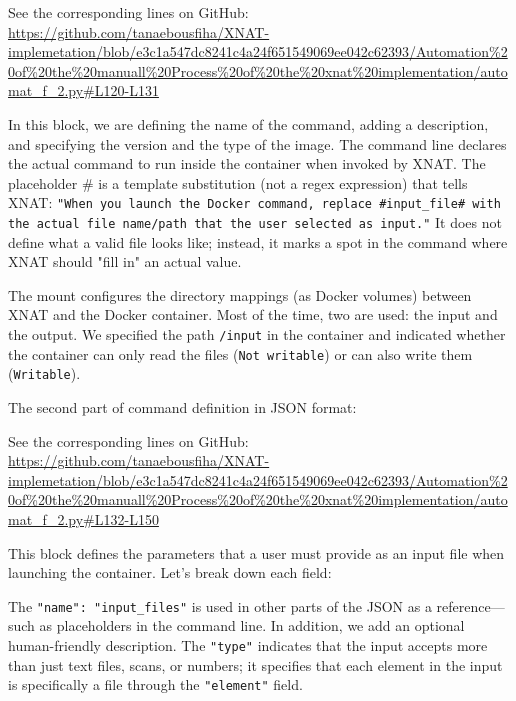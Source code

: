 \noindent\footnotesize See the corresponding lines on GitHub:\url{ https://github.com/tanaebousfiha/XNAT-implemetation/blob/e3c1a547dc8241c4a24f651549069ee042c62393/Automation%20of%20the%20manuall%20Process%20of%20the%20xnat%20implementation/automat_f_2.py#L120-L131}
\normalsize


In this block, we are defining the name of the command, adding a description, and specifying the version and the type of the image.
The command line declares the actual command to run inside the container when invoked by XNAT. The placeholder \# is a template substitution (not a regex expression) that tells XNAT: \texttt{"When you launch the Docker command, replace \#input\_file\# with the actual file name/path that the user selected as input."} It does not define what a valid file looks like; instead, it marks a spot in the command where XNAT should "fill in" an actual value.


The mount configures the directory mappings (as Docker volumes) between XNAT and the Docker container. Most of the time, two are used: the input and the output.
We specified the path \texttt{/input} in the container and indicated whether the container can only read the files (\texttt{Not writable}) or can also write them (\texttt{Writable}).

The second part of command definition in JSON format:




\noindent\footnotesize See the corresponding lines on GitHub: \url{ https://github.com/tanaebousfiha/XNAT-implemetation/blob/e3c1a547dc8241c4a24f651549069ee042c62393/Automation%20of%20the%20manuall%20Process%20of%20the%20xnat%20implementation/automat_f_2.py#L132-L150}
\normalsize

This block defines the parameters that a user must provide as an input file when launching the container.
Let’s break down each field:

The \texttt{"name": "input\_files"} is used in other parts of the JSON as a reference---such as placeholders in the command line. In addition, we add an optional human-friendly description. The \texttt{"type"} indicates that the input accepts more than just text files, scans, or numbers; it specifies that each element in the input is specifically a file through the \texttt{"element"} field.

